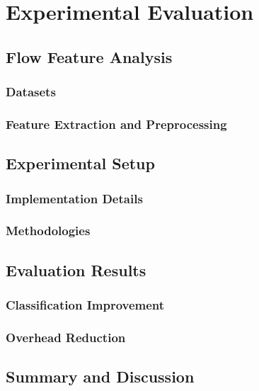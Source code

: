 \documentclass[../../main.tex]{subfiles}
\begin{document}
\chapter{Experimental Evaluation}

\section{Flow Feature Analysis}

\subsection{Datasets}

\subsection{Feature Extraction and Preprocessing}

\section{Experimental Setup}

\subsection{Implementation Details}

\subsection{Methodologies}

\section{Evaluation Results}

\subsection{Classification Improvement}

\subsection{Overhead Reduction}

\section{Summary and Discussion}
\end{document}
